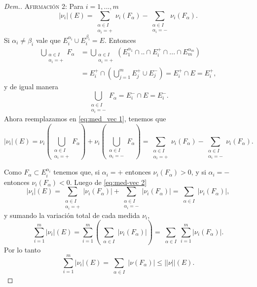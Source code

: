 \begin{proof}[Dem.]
\textsc{Afirmación 2:} 
Para $i=1,...,m$ 
  \begin{equation}\label{eq:med-vec 2}
  	|\nu_i|(E)= \sum_{\substack{\alpha\in I\\ \alpha_i=+}}\nu_i(F_\alpha)-\sum_{\substack{\alpha\in I\\ \alpha_i=-}}\nu_i(F_\alpha).
  \end{equation}
  Si $\alpha_i\neq \beta_i$  vale que $E_i^{\alpha_i}\cup E_i^{\beta_i}=E$. Entonces
  \begin{equation*}
      \begin{split}
        \bigcup_{\substack{\alpha\in I\\ \alpha_i=+}}F_\alpha&=\bigcup_{\substack{\alpha\in I\\ \alpha_i=+}}\left( E_1^{\alpha_1}\cap..\cap  E_i^+\cap...\cap E_m^{\alpha_m} \right)\\
        &=E_i^+\cap \left(\bigcup_{j=1}^m E_j^+\cup E_j^- \right)=E_i^+\cap E=E_i^+,
      \end{split}
  \end{equation*}
  y de igual manera 
  \begin{equation*}
        \bigcup_{\substack{\alpha\in I\\ \alpha_i=-}}F_\alpha=
        E_i^-\cap E=E_i^-.
  \end{equation*}
Ahora reemplazamos en \eqref{eq:med_vec 1}, tenemos que 
\begin{equation*}
  	|\nu_i|(E)=\nu_i \left( \bigcup_{\substack{\alpha\in I\\ \alpha_i=+}}F_\alpha\right) + \nu_i \left( \bigcup_{\substack{\alpha\in I\\ \alpha_i=-}}F_\alpha\right)= \sum_{\substack{\alpha\in I\\ \alpha_i=+}}\nu_i(F_\alpha)-\sum_{\substack{\alpha\in I\\ \alpha_i=-}}\nu_i(F_\alpha).
  \end{equation*}
  
  
  
 
 Como $F_{\alpha}\subset E_i^{\alpha_i}$ tenemos que, si $\alpha_i=+$ entonces $\nu_i(F_\alpha)>0$, y  si $\alpha_i=-$ entonces $\nu_i(F_\alpha)<0$. Luego de \eqref{eq:med-vec 2}
  \begin{equation*}
  	|\nu_i|(E)= \sum_{\substack{\alpha\in I\\ \alpha_i=+}}|\nu_i(F_\alpha)|+\sum_{\substack{\alpha\in I\\ \alpha_i=-}}|\nu_i(F_\alpha)|=\sum_{\substack{\alpha\in I}}|\nu_i(F_\alpha)|,
  \end{equation*}
  y sumando la variación total de cada medida $\nu_i$,
   \begin{equation*}
  	\sum_{i=1}^{m}|\nu_i|(E)=\sum_{i=1}^{m}\left( \sum_{\substack{\alpha\in I}}|\nu_i(F_\alpha)|\right) = \sum_{\substack{\alpha\in I}}\sum_{i=1}^{m}|\nu_i(F_\alpha)|.
  \end{equation*}
  Por lo tanto
  \begin{equation*}
  	\sum_{i=1}^{m}|\nu_i|(E)= \sum_{\substack{\alpha\in I}}|\nu(F_\alpha)|\leq ||\nu||(E).
  \end{equation*}
  
\end{proof}
